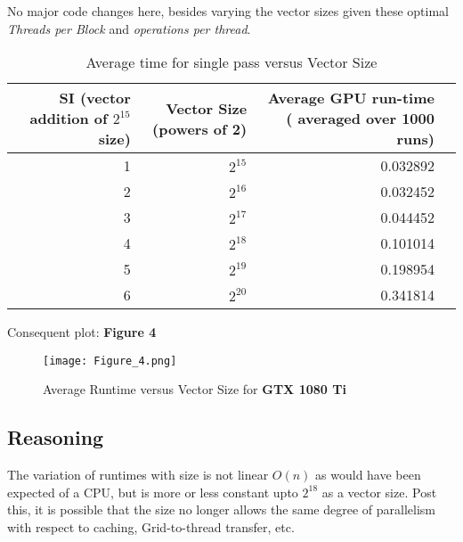  No major code changes here, besides varying the vector sizes given these optimal \textit{Threads per Block} and \textit{operations per thread}. \\

\begin{table}[ht]
\footnotesize
\centering
\begin{tabular}{r||rrr}
 SI (vector addition of $2^{15}$ size) & Vector Size (powers of 2) & Average GPU run-time ( averaged over 1000 runs)  \\ 
 \hline \hline
1 & $2^{15}$ &  0.032892 \\ 
2& $2^{16}$   & 0.032452 \\
3&  $2^{17}$ & 0.044452 \\
4&  $2^{18}$ & 0.101014 \\
5&  $2^{19}$ & 0.198954 \\
6 &  $2^{20}$ &0.341814 \\
\end{tabular}
\caption{Average time for single pass versus Vector Size}
\end{table}
 
 Consequent plot: \textbf{Figure 4}
 
 \begin{figure}[ht]
\centering
\texttt{[image: Figure\_4.png]}
\caption{Average Runtime versus Vector Size for \textbf{GTX 1080 Ti}}
\end{figure}


\subsection{Reasoning}

The variation of runtimes with size is not linear $O(n)$ as would have been expected of a CPU, but is more or less constant upto $2^{18}$ as a vector size. Post this, it is possible that the size no longer allows the same degree of parallelism with respect to caching, Grid-to-thread transfer, etc.
 
